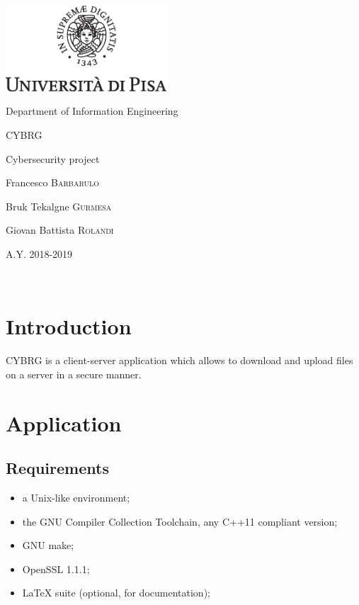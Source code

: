 \documentclass[a4paper,12pt]{article}
\newcommand{\projectname}{CYBRG}
\begin{document}

{
  \begin{titlepage}
  	\centering
  	\includegraphics[width=6cm]{img/unipi.eps}\par
    \vspace{1.5cm}
    {\Large Department of Information Engineering \par}
  	\vspace{1.5cm}
  	{\huge\textsc{\projectname{}}\par}
    \vspace{0.5cm}
    {\Large Cybersecurity project \par}
  	\vspace{2cm}
  	Francesco \textsc{Barbarulo}\par
  	Bruk Tekalgne \textsc{Gurmesa}\par
    Giovan Battista \textsc{Rolandi}

  	\vfill

  	{\large A.Y. 2018-2019\par}
  \end{titlepage}
}


\clearpage
~
\clearpage
\tableofcontents
\clearpage
~
\clearpage
{}

\section{Introduction}
\projectname{} is a client-server application which allows to download and upload files on a server in a secure manner.

\section{Application}
\subsection{Requirements}
\begin{itemize}
  \item a Unix-like environment;
  \item the GNU Compiler Collection Toolchain, any C++11 compliant version;
  \item GNU make;
  \item OpenSSL 1.1.1;
  \item LaTeX suite (optional, for documentation);
\end{itemize}
\end{document}
